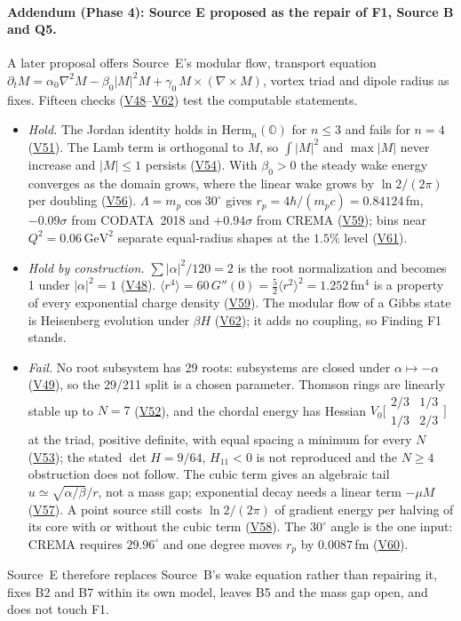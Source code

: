\documentclass[11pt]{article}
\theoremstyle{definition}
\theoremstyle{remark}
\newcommand{\V}[1]{\hyperref[app:verify]{\textsf{#1}}}
\begin{document}
\paragraph{Addendum (Phase 4): Source E proposed as the repair of F1, Source B and Q5.} A later proposal offers Source~E's modular flow, transport equation $\partial_tM=\alpha_0\nabla^2M-\beta_0|M|^2M+\gamma_0\,M\times(\nabla\times M)$, vortex triad and dipole radius as fixes. Fifteen checks (\V{V48}--\V{V62}) test the computable statements.
\begin{itemize}
\item \emph{Hold.} The Jordan identity holds in $\mathrm{Herm}_n(\mathbb O)$ for $n\le3$ and fails for $n=4$ (\V{V51}). The Lamb term is orthogonal to $M$, so $\int|M|^2$ and $\max|M|$ never increase and $|M|\le1$ persists (\V{V54}). With $\beta_0>0$ the steady wake energy converges as the domain grows, where the linear wake grows by $\ln2/(2\pi)$ per doubling (\V{V56}). $\Lambda=m_p\cos30^\circ$ gives $r_p=4\hbar/(m_pc)=0.84124$\,fm, $-0.09\sigma$ from CODATA~2018 and $+0.94\sigma$ from CREMA (\V{V59}); bins near $Q^2=0.06\,\mathrm{GeV}^2$ separate equal-radius shapes at the $1.5\%$ level (\V{V61}).
\item \emph{Hold by construction.} $\sum|\alpha|^2/120=2$ is the root normalization and becomes 1 under $|\alpha|^2=1$ (\V{V48}). $\langle r^4\rangle=60\,G''(0)=\tfrac52\langle r^2\rangle^2=1.252$\,fm$^4$ is a property of every exponential charge density (\V{V59}). The modular flow of a Gibbs state is Heisenberg evolution under $\beta H$ (\V{V62}); it adds no coupling, so Finding F1 stands.
\item \emph{Fail.} No root subsystem has 29 roots: subsystems are closed under $\alpha\mapsto-\alpha$ (\V{V49}), so the 29/211 split is a chosen parameter. Thomson rings are linearly stable up to $N=7$ (\V{V52}), and the chordal energy has Hessian $V_0\bigl[\begin{smallmatrix}2/3&1/3\\1/3&2/3\end{smallmatrix}\bigr]$ at the triad, positive definite, with equal spacing a minimum for every $N$ (\V{V53}); the stated $\det H=9/64$, $H_{11}<0$ is not reproduced and the $N\ge4$ obstruction does not follow. The cubic term gives an algebraic tail $u\simeq\sqrt{\alpha/\beta}/r$, not a mass gap; exponential decay needs a linear term $-\mu M$ (\V{V57}). A point source still costs $\ln2/(2\pi)$ of gradient energy per halving of its core with or without the cubic term (\V{V58}). The $30^\circ$ angle is the one input: CREMA requires $29.96^\circ$ and one degree moves $r_p$ by $0.0087$\,fm (\V{V60}).
\end{itemize}
Source~E therefore replaces Source~B's wake equation rather than repairing it, fixes B2 and B7 within its own model, leaves B5 and the mass gap open, and does not touch F1.
\end{document}
